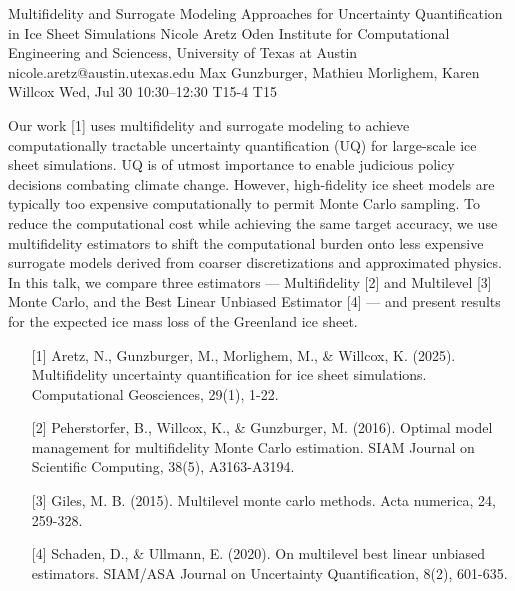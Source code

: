 \begin{talk}
  {Multifidelity and Surrogate Modeling Approaches for Uncertainty Quantification in Ice Sheet Simulations}%
  {Nicole Aretz}%
  {Oden Institute for Computational Engineering and Sciencess, University of Texas at Austin}%
  {nicole.aretz@austin.utexas.edu}%
  {Max Gunzburger, Mathieu Morlighem, Karen Willcox}%
  {}%
  {Wed, Jul 30 10:30–12:30}%
  {T15-4}%
  {T15}%
  
				
			
Our work [1] uses multifidelity and surrogate modeling to achieve computationally tractable uncertainty quantification (UQ) for large-scale ice sheet simulations. UQ is of utmost importance to enable judicious policy decisions combating climate change. However, high-fidelity ice sheet models are typically too expensive computationally to permit Monte Carlo sampling. To reduce the computational cost while achieving the same target accuracy, we use multifidelity estimators to shift the computational burden onto less expensive surrogate models derived from coarser discretizations and approximated physics. In this talk, we compare three estimators — Multifidelity [2] and Multilevel [3] Monte Carlo, and the Best Linear Unbiased Estimator [4] — and present results for the expected ice mass loss of the Greenland ice sheet.

\medskip

\begin{enumerate}
	\item[{[1]}] Aretz, N., Gunzburger, M., Morlighem, M., \& Willcox, K. (2025). Multifidelity uncertainty quantification for ice sheet simulations. Computational Geosciences, 29(1), 1-22.
	\item[{[2]}] Peherstorfer, B., Willcox, K., \& Gunzburger, M. (2016). Optimal model management for multifidelity Monte Carlo estimation. SIAM Journal on Scientific Computing, 38(5), A3163-A3194.
    \item[{[3]}] Giles, M. B. (2015). Multilevel monte carlo methods. Acta numerica, 24, 259-328.
    \item[{[4]}] Schaden, D., \& Ullmann, E. (2020). On multilevel best linear unbiased estimators. SIAM/ASA Journal on Uncertainty Quantification, 8(2), 601-635.
\end{enumerate}

\end{talk}

